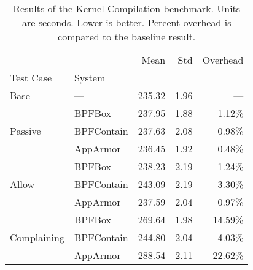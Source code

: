 \begin{table}[ht!]
\centering
\footnotesize
\caption[Results of the Kernel Compilation benchmark]{Results of the Kernel Compilation benchmark. Units are seconds. Lower is better. Percent overhead is compared to the baseline result.}
\label{tab:phoronix-kernel-compilation}
\begin{tabular}{llrrr}
\toprule
            &          &    Mean &   Std & Overhead \\
Test Case & System &         &       &          \\
\midrule
Base & --- &  235.32 &  1.96 &      --- \\
\cline{1-5}
\multirow{3}{*}{Passive} & BPFBox &  237.95 &  1.88 &   1.12\% \\
            & BPFContain &  237.63 &  2.08 &   0.98\% \\
            & AppArmor &  236.45 &  1.92 &   0.48\% \\
\cline{1-5}
\multirow{3}{*}{Allow} & BPFBox &  238.23 &  2.19 &   1.24\% \\
            & BPFContain &  243.09 &  2.19 &   3.30\% \\
            & AppArmor &  237.59 &  2.04 &   0.97\% \\
\cline{1-5}
\multirow{3}{*}{Complaining} & BPFBox &  269.64 &  1.98 &  14.59\% \\
            & BPFContain &  244.80 &  2.04 &   4.03\% \\
            & AppArmor &  288.54 &  2.11 &  22.62\% \\
\bottomrule
\end{tabular}
\end{table}
